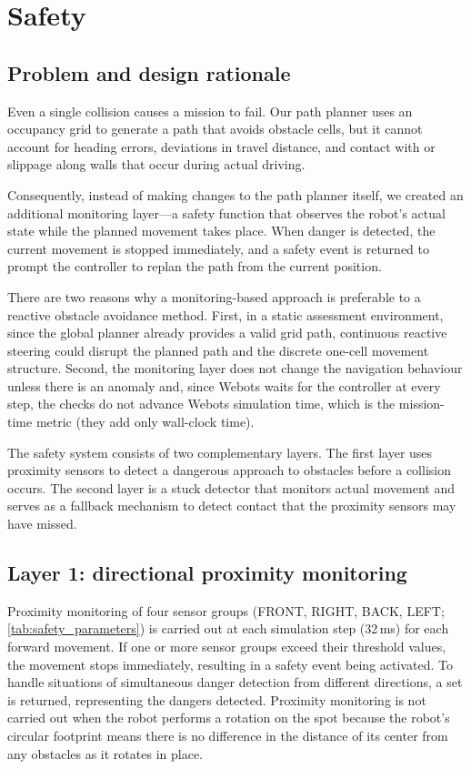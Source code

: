 \section{Safety}
\label{sec:safety}

\subsection{Problem and design rationale}
Even a single collision causes a mission to fail. 
Our path planner uses an occupancy grid to generate a path that avoids obstacle cells, but it cannot account for heading errors, deviations in travel distance, and contact with or slippage along walls that occur during actual driving. 

Consequently, instead of making changes to the path planner itself, we created an additional monitoring layer---a safety function that observes the robot's actual state while the planned movement takes place. 
When danger is detected, the current movement is stopped immediately, and a safety event is returned to prompt the controller to replan the path from the current position.

There are two reasons why a monitoring-based approach is preferable to a reactive obstacle avoidance method. 
First, in a static assessment environment, since the global planner already provides a valid grid path, continuous reactive steering could disrupt the planned path and the discrete one-cell movement structure. 
Second, the monitoring layer does not change the navigation behaviour unless there is an anomaly and, since Webots waits for the controller at every step, the checks do not advance Webots simulation time, which is the mission-time metric (they add only wall-clock time).

The safety system consists of two complementary layers. 
The first layer uses proximity sensors to detect a dangerous approach to obstacles before a collision occurs. 
The second layer is a stuck detector that monitors actual movement and serves as a fallback mechanism to detect contact that the proximity sensors may have missed.

\subsection{Layer 1: directional proximity monitoring}
Proximity monitoring of four sensor groups (FRONT, RIGHT, BACK, LEFT; \cref{tab:safety_parameters}) is carried out at each simulation step (32\,ms) for each forward movement.
If one or more sensor groups exceed their threshold values, the movement stops immediately, resulting in a safety event being activated. 
To handle situations of simultaneous danger detection from different directions, a set is returned, representing the dangers detected. 
Proximity monitoring is not carried out when the robot performs a rotation on the spot because the robot's circular footprint means there is no difference in the distance of its center from any obstacles as it rotates in place. 

